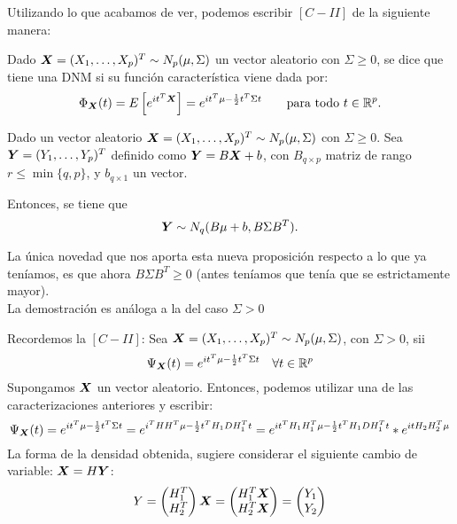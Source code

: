 Utilizando lo que acabamos de ver, podemos escribir $[C-II]$ de la siguiente manera:
\begin{nprop}
  Dado $\boldsymbol{X} = (X_1,\dots,X_p)^T \sim N_p(\mu,\Sigma)$ un vector aleatorio con $\Sigma \geq 0$, se dice que tiene una DNM si su función característica viene dada por:
  \[
\Phi_{\boldsymbol{X}}(t) = E\left[e^{it^T \boldsymbol{X}}\right] = e^{it^T \mu - \frac{1}{2}t^T \Sigma t} \qquad \text{para todo } t \in \mathbb R^p.
  \]

\end{nprop}

\begin{nprop}
  Dado un vector aleatorio $\boldsymbol{X}  = (X_1,\dots,X_p)^T \sim N_p(\mu,\Sigma)$ con $\Sigma \geq 0$. Sea $\boldsymbol{Y} = (Y_1,\dots,Y_p)^T$ definido como $\boldsymbol{Y} = B\boldsymbol{X} + b$, con $B_{q\times p}$ matriz de rango $r \leq \min \{q,p\}$, y $b_{q \times 1}$ un vector.

  Entonces, se tiene que
  \[
  \boldsymbol{Y} \sim N_q(B\mu+b, B\Sigma B^T).
  \]

\end{nprop}
\begin{nota}
  La única novedad que nos aporta esta nueva proposición respecto a lo que ya teníamos, es que ahora $B\Sigma B^T \geq 0$ (antes teníamos que tenía que se estrictamente mayor).\\

  La demostración es análoga a la del caso $\Sigma > 0$
\end{nota}


Recordemos la $[C-II]$: Sea $\boldsymbol{X} = (X_1,\dots,X_p)^T\sim N_p(\mu,\Sigma)$, con $\Sigma > 0$, sii
\[
\Psi_{\boldsymbol{X}}(t) = e^{it^T\mu - \frac{1}{2}t^T\Sigma t} \quad \forall t\in \mathbb R^p
\]
Supongamos $\boldsymbol{X}$ un vector aleatorio. Entonces, podemos utilizar una de las caracterizaciones anteriores y escribir:
\[
\Psi_{\boldsymbol{X}}(t) = e^{it^T\mu - \frac{1}{2}t^T\Sigma t} = e^{i^T HH^T \mu - \frac{1}{2}t^T H_1 D H_1^T t} = e^{it^T H_1 H_1^T\mu - \frac{1}{2}t^T H_1DH_1^Tt}* e^{itH_2H_2^T \mu}
\]
La forma de la densidad obtenida, sugiere considerar el siguiente cambio de variable: $\boldsymbol{X} = H\boldsymbol{Y}$:
\[
Y = \begin{pmatrix} H_1^T \\ H_2^T \end{pmatrix} \boldsymbol{X}=\begin{pmatrix} H_1^T \boldsymbol{X} \\ H_2^T\boldsymbol{X} \end{pmatrix} = \begin{pmatrix} Y_1 \\ Y_2 \end{pmatrix}
\]

